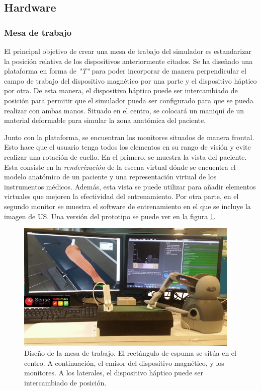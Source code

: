 \subsection{Hardware}


\subsubsection{Mesa de trabajo}

El principal objetivo de crear una mesa de trabajo del simulador es estandarizar la posición relativa de los dispositivos anteriormente citados. %
Se ha diseñado una plataforma en forma de \emph{"T"} para poder incorporar de manera perpendicular el campo de trabajo del dispositivo magnético por una parte y el dispositivo háptico por otra. De esta manera, el dispositivo háptico puede ser intercambiado de posición para permitir que el simulador pueda ser configurado para que se pueda realizar con ambas manos. Situado en el centro, se colocará un maniquí de un material deformable para simular la zona anatómica del paciente. 

Junto con la plataforma, se encuentran los monitores situados de manera frontal. Esto hace que el usuario tenga todos los elementos en su rango de visión y evite realizar una rotación de cuello. En el primero, se muestra la vista del paciente. Esta consiste en la \emph{renderización} de la escena virtual dónde se encuentra el modelo anatómico de un paciente y una representación virtual de los instrumentos médicos. Además, esta vista se puede utilizar para añadir elementos virtuales que mejoren la efectividad del entrenamiento. 
Por otra parte, en el segundo monitor se muestra el software de entrenamiento en el que se incluye la imagen de \ac{US}. Una versión del prototipo se puede ver en la figura \ref{fig:simulator}.


\begin{figure}[ht]
    \centering
    \includegraphics[width=0.95\textwidth]{IMG/simulator.jpg}
    \caption{Diseño de la mesa de trabajo. El rectángulo de espuma se sitúa en el centro. A continuación, el emisor del dispositivo magnético, y los monitores. A los laterales, el dispositivo háptico puede ser intercambiado de posición.}
    \label{fig:simulator}
\end{figure}


